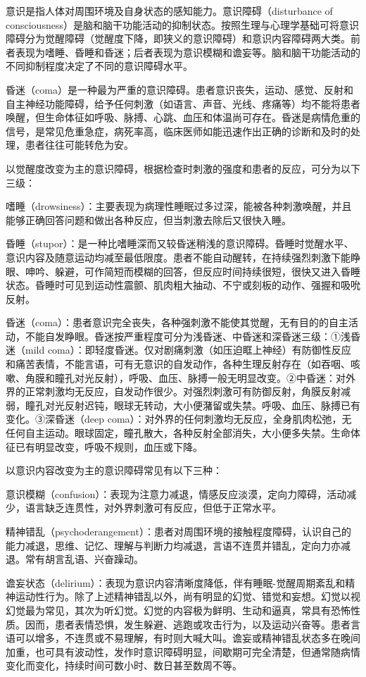 意识是指人体对周围环境及自身状态的感知能力。意识障碍（disturbance of
consciousness）是脑和脑干功能活动的抑制状态。按照生理与心理学基础可将意识障碍分为觉醒障碍（觉醒度下降，即狭义的意识障碍）和意识内容障碍两大类。前者表现为嗜睡、昏睡和昏迷；后者表现为意识模糊和谵妄等。脑和脑干功能活动的不同抑制程度决定了不同的意识障碍水平。

昏迷（coma）是一种最为严重的意识障碍。患者意识丧失，运动、感觉、反射和自主神经功能障碍，给予任何刺激（如语言、声音、光线、疼痛等）均不能将患者唤醒，但生命体征如呼吸、脉搏、心跳、血压和体温尚可存在。昏迷是病情危重的信号，是常见危重急症，病死率高，临床医师如能迅速作出正确的诊断和及时的处理，患者往往可能转危为安。

以觉醒度改变为主的意识障碍，根据检查时刺激的强度和患者的反应，可分为以下三级：

嗜睡（drowsiness）：主要表现为病理性睡眠过多过深，能被各种刺激唤醒，并且能够正确回答问题和做出各种反应，但当刺激去除后又很快入睡。

昏睡（stupor）：是一种比嗜睡深而又较昏迷稍浅的意识障碍。昏睡时觉醒水平、意识内容及随意运动均减至最低限度。患者不能自动醒转，在持续强烈刺激下能睁眼、呻吟、躲避，可作简短而模糊的回答，但反应时间持续很短，很快又进入昏睡状态。昏睡时可见到运动性震颤、肌肉粗大抽动、不宁或刻板的动作、强握和吸吮反射。

昏迷（coma）：患者意识完全丧失，各种强刺激不能使其觉醒，无有目的的自主活动，不能自发睁眼。昏迷按严重程度可分为浅昏迷、中昏迷和深昏迷三级：①浅昏迷（mild
coma）：即轻度昏迷。仅对剧痛刺激（如压迫眶上神经）有防御性反应和痛苦表情，不能言语，可有无意识的自发动作，各种生理反射存在（如吞咽、咳嗽、角膜和瞳孔对光反射），呼吸、血压、脉搏一般无明显改变。②中昏迷：对外界的正常刺激均无反应，自发动作很少。对强烈刺激可有防御反射，角膜反射减弱，瞳孔对光反射迟钝，眼球无转动，大小便潴留或失禁。呼吸、血压、脉搏已有变化。③深昏迷（deep
coma）：对外界的任何刺激均无反应，全身肌肉松弛，无任何自主运动。眼球固定，瞳孔散大，各种反射全部消失，大小便多失禁。生命体征已有明显改变，呼吸不规则，血压或下降。

以意识内容改变为主的意识障碍常见有以下三种：

意识模糊（confusion）：表现为注意力减退，情感反应淡漠，定向力障碍，活动减少，语言缺乏连贯性，对外界刺激可有反应，但低于正常水平。

精神错乱（psychoderangement）：患者对周围环境的接触程度障碍，认识自己的能力减退，思维、记忆、理解与判断力均减退，言语不连贯并错乱，定向力亦减退。常有胡言乱语、兴奋躁动。

谵妄状态（delirium）：表现为意识内容清晰度降低，伴有睡眠-觉醒周期紊乱和精神运动性行为。除了上述精神错乱以外，尚有明显的幻觉、错觉和妄想。幻觉以视幻觉最为常见，其次为听幻觉。幻觉的内容极为鲜明、生动和逼真，常具有恐怖性质。因而，患者表情恐惧，发生躲避、逃跑或攻击行为，以及运动兴奋等。患者言语可以增多，不连贯或不易理解，有时则大喊大叫。谵妄或精神错乱状态多在晚间加重，也可具有波动性，发作时意识障碍明显，间歇期可完全清楚，但通常随病情变化而变化，持续时间可数小时、数日甚至数周不等。

